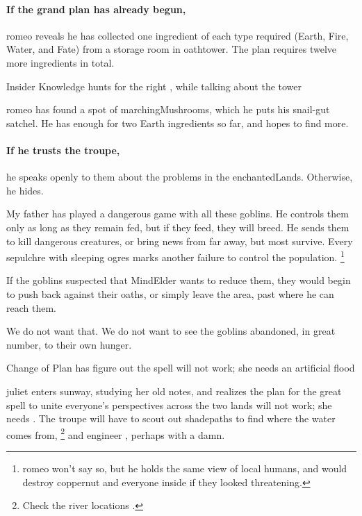 \paragraph{If the grand plan has already begun,}
\Gls{romeo} reveals he has collected one \gls{ingredient} of each type required (Earth, Fire, Water, and Fate) from a storage room in \gls{oathtower}.
The plan requires twelve more \glspl{ingredient} in total.

{Insider Knowledge}%
{ hunts for the right , while talking about the tower}%

\Gls{romeo} has found a spot of \glspl{marchingMushroom}, which he puts his snail-gut satchel.
He has enough for two Earth \glspl{ingredient} so far, and hopes to find more.

\paragraph{If he trusts the troupe,}
he speaks openly to them about the problems in the \gls{enchantedLands}.
Otherwise, he hides.

\begin{speechtext}
  My father has played a dangerous game with all these goblins.
  He controls them only as long as they remain fed, but if they feed, they will breed.
  He sends them to kill dangerous creatures, or bring news from far away, but most survive.
  Every sepulchre with sleeping \glspl{ogre} marks another failure to control the population.%
  \footnote{\Gls{romeo} won't say so, but he holds the same view of local humans, and would destroy \gls{coppernut} and everyone inside if they looked threatening.}

  If the goblins suspected that \gls{MindElder} wants to reduce them, they would begin to push back against their oaths, or simply leave the area, past where he can reach them.

  We do not want that.
  We do not want to see the goblins abandoned, in great number, to their own hunger.
\end{speechtext}

{Change of Plan}%
{ has figure out the spell will not work; she needs an artificial \gls{flood}}%

\Gls{juliet} enters \gls{sunway}, studying her old notes, and realizes the plan for the great spell to unite everyone's perspectives across the two lands will not work; she needs .
The troupe will have to scout out \gls{shadepaths} to find where the water comes from,%
\footnote{Check the river locations .}
and engineer , perhaps with a damn.

